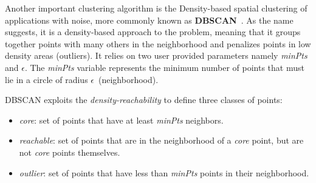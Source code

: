 Another important clustering algorithm is the Density-based spatial clustering of applications with noise, more commonly known as \textbf{DBSCAN}~\cite{ester1996density}.
As the name suggests, it is a density-based approach to the problem,
meaning that it groups together points with many others in the neighborhood
and penalizes points in low density areas (outliers).
It relies on two user provided parameters namely \emph{minPts} and $\epsilon$.
The \emph{minPts} variable represents the minimum number of points that must lie in a circle of radius $\epsilon$~(neighborhood).

DBSCAN exploits the \emph{density-reachability} to define three classes of points:
\begin{itemize}
    \item \emph{core}: set of points that have at least \emph{minPts} neighbors.
    \item \emph{reachable}:
        set of points that are in the neighborhood of a \emph{core} point,
        but are not \emph{core} points themselves.
    \item \emph{outlier}:
        set of points that have less than \emph{minPts} points in their neighborhood.
\end{itemize}

